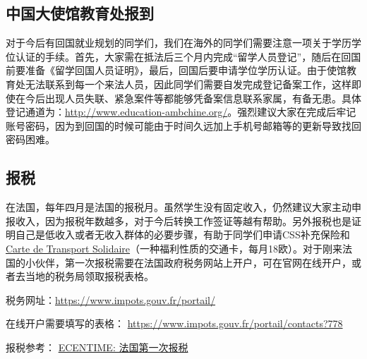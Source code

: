 \subsection{中国大使馆教育处报到}

对于今后有回国就业规划的同学们，我们在海外的同学们需要注意一项关于学历学位认证的手续。首先，大家需在抵法后三个月内完成“留学人员登记”，随后在回国前要准备《留学回国人员证明》，最后，回国后要申请学位学历认证。由于使馆教育处无法联系到每一个来法人员，因此同学们需要自发完成登记备案工作，这样即使在今后出现人员失联、紧急案件等都能够凭备案信息联系家属，有备无患。具体登记通道为：\href{http://www.education-ambchine.org/}{http://www.education-ambchine.org/}。强烈建议大家在完成后牢记账号密码，因为到回国的时候可能由于时间久远加上手机号邮箱等的更新导致找回密码困难。

\subsection{报税}
在法国，每年四月是法国的报税月。虽然学生没有固定收入，仍然建议大家主动申报收入，因为报税年数越多，对于今后转换工作签证等越有帮助。另外报税也是证明自己是低收入或者无收入群体的必要步骤，有助于同学们申请CSS补充保险和\href{https://www.solidaritetransport.fr/}{Carte de Transport Solidaire}（一种福利性质的交通卡，每月18欧）。对于刚来法国的小伙伴，第一次报税需要在法国政府税务网站上开户，可在官网在线开户，或者去当地的税务局领取报税表格。

税务网址：\href{https://www.impots.gouv.fr/portail/}{https://www.impots.gouv.fr/portail/} 

在线开户需要填写的表格：
\href{https://www.impots.gouv.fr/portail/contacts?778}{https://www.impots.gouv.fr/portail/contacts?778}

报税参考：
\href{https://www.ecentime.com/article/ecentime-impots-france}{ECENTIME: 法国第一次报税}
